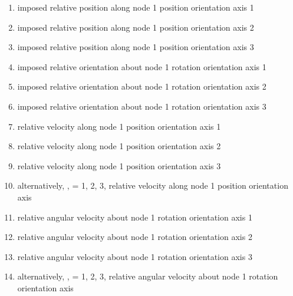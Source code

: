 \begin{enumerate}
\item {} imposed relative position along node 1 position orientation axis 1
\item {} imposed relative position along node 1 position orientation axis 2
\item {} imposed relative position along node 1 position orientation axis 3

\item {} imposed relative orientation about node 1 rotation orientation axis 1
\item {} imposed relative orientation about node 1 rotation orientation axis 2
\item {} imposed relative orientation about node 1 rotation orientation axis 3

\item {} relative velocity along node 1 position orientation axis 1
\item {} relative velocity along node 1 position orientation axis 2
\item {} relative velocity along node 1 position orientation axis 3

\item[-] alternatively, ,  = 1, 2, 3, relative velocity along node 1 position orientation axis 

\item {} relative angular velocity about node 1 rotation orientation axis 1
\item {} relative angular velocity about node 1 rotation orientation axis 2
\item {} relative angular velocity about node 1 rotation orientation axis 3

\item[-] alternatively, ,  = 1, 2, 3, relative angular velocity about node 1 rotation orientation axis 
\end{enumerate}

